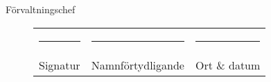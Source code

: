 \documentclass[10pt]{article}
\begin{document}
Förvaltningschef
\vspace*{10mm}
\begin{figure}[H]
\begin{tabularx}{\textwidth}{p{} p{} p{}}
    \rule{0.3\textwidth}{0.4pt} &
    \rule{0.3\textwidth}{0.4pt} &
    \rule{0.3\textwidth}{0.4pt} \\
    Signatur &
    Namnförtydligande &
    Ort \& datum \\
\end{tabularx}
\end{figure}
\end{document}
